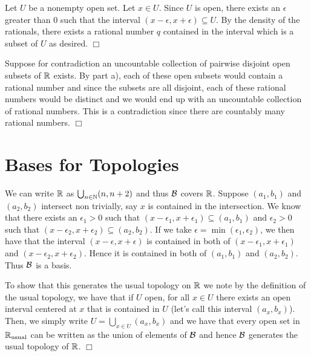 \documentclass{article}
\begin{document}
 {
    \begin{spacedenumerate}
        \item Let $U$ be a nonempty open set. Let $x\in U$. Since $U$ is open, there exists an $\epsilon$ greater than 0 such that the interval $(x-\epsilon, x+\epsilon)\subseteq U$. By the density of the rationals, there exists a rational number $q$ contained in the interval which is a subset of $U$ as desired. $\Box$
        \item Suppose for contradiction an uncountable collection of pairwise disjoint open subsets of $\mathbb{R}$ exists. By part a), each of these open subsets would contain a rational number and since the subsets are all disjoint, each of these rational numbers would be distinct and we would end up with an uncountable collection of rational numbers. This is a contradiction since there are countably many rational numbers. $\Box$
    \end{spacedenumerate}
}
\section{Bases for Topologies}
 {
    We can write $\mathbb{R}$ as $\bigcup_{n\in\mathbb{N}}(n, n+2)$ and thus $\mathcal{B}$ covers $\mathbb{R}$. Suppose $(a_{1}, b_{1})$ and $(a_{2}, b_{2})$ intersect non trivially, say $x$ is contained in the intersection. We know that there exists an $\epsilon_{1} > 0$ such that $(x-\epsilon_{1}, x+\epsilon_{1}) \subseteq (a_{1}, b_{1})$ and $\epsilon_{2} > 0$ such that $(x-\epsilon_{2}, x + \epsilon_{2}) \subseteq (a_{2}, b_{2})$. If we take $\epsilon = \min(\epsilon_{1}, \epsilon_{2})$, we then have that the interval $(x-\epsilon, x+\epsilon)$ is contained in both of $(x-\epsilon_{1}, x + \epsilon_{1})$ and $(x-\epsilon_{2}, x + \epsilon_{2})$. Hence it is contained in both of $(a_{1}, b_{1})$ and $(a_{2}, b_{2})$. Thus $\mathcal{B}$ is a basis.

    To show that this generates the usual topology on $\mathbb{R}$ we note by the definition of the usual topology, we have that if $U$ open, for all $x\in U$ there exists an open interval centered at $x$ that is contained in $U$ (let's call this interval $(a_{x}, b_{x})$). Then, we simply write $U = \bigcup_{x\in U}(a_{x}, b_{x})$ and we have that every open set in $\mathbb{R}_{\text{usual}}$ can be written as the union of elements of $\mathcal{B}$ and hence $\mathcal{B}$ generates the usual topology of $\mathbb{R}$. $\Box$
}
\end{document}
